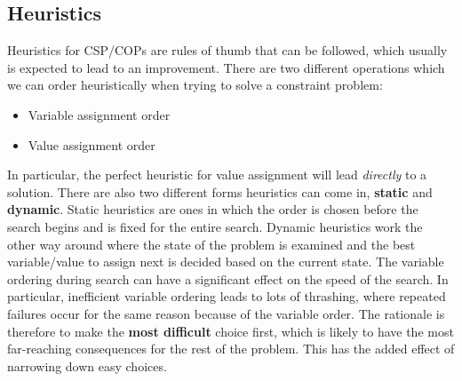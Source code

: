 \documentclass[CS4402-Notes.tex]{subfiles}
\begin{document}
\subsection{Heuristics}
Heuristics for CSP/COPs are rules of thumb that can be followed, which usually is expected to lead to an improvement. There are two different operations which we can order heuristically when trying to solve a constraint problem:
\begin{itemize}
\item Variable assignment order
\item Value assignment order
\end{itemize}
In particular, the perfect heuristic for value assignment will lead \textit{directly} to a solution.
\n
There are also two different forms heuristics can come in, \textbf{static} and \textbf{dynamic}. Static heuristics are ones in which the order is chosen before the search begins and is fixed for the entire search. Dynamic heuristics work the other way around where the state of the problem is examined and the best variable/value to assign next is decided based on the current state.
\n
The variable ordering during search can have a significant effect on the speed of the search. In particular, inefficient variable ordering leads to lots of thrashing, where repeated failures occur for the same reason because of the variable order. The rationale is therefore to make the \textbf{most difficult} choice first, which is likely to have the most far-reaching consequences for the rest of the problem. This has the added effect of narrowing down easy choices. 
\end{document}
